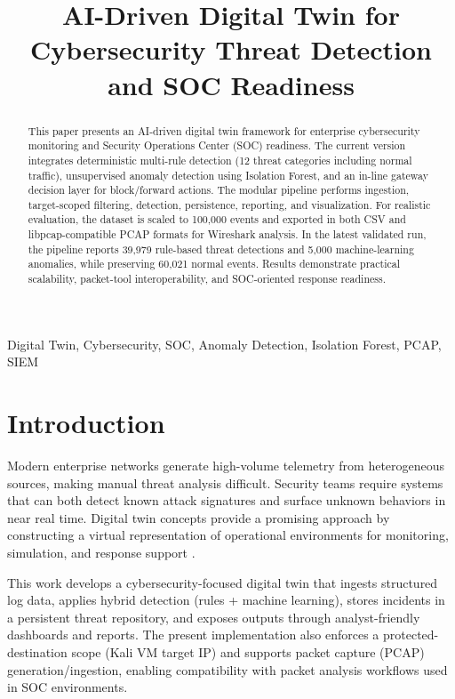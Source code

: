 \documentclass[conference]{IEEEtran}
\title{AI-Driven Digital Twin for Cybersecurity Threat Detection and SOC Readiness}
\author{%
\IEEEauthorblockN{U Jithendra Bhupathi Raju, K Aditya Sai}
\IEEEauthorblockA{Department of Computer Science and Engineering (Cyber Security)\\
Amrita Vishwa Vidyapeetham\\
Emails: jithendraupendram0@gmail.com, adityasai@gmail.com}
}
\begin{document}
\maketitle

\begin{abstract}
This paper presents an AI-driven digital twin framework for enterprise cybersecurity monitoring and Security Operations Center (SOC) readiness. The current version integrates deterministic multi-rule detection (12 threat categories including normal traffic), unsupervised anomaly detection using Isolation Forest, and an in-line gateway decision layer for block/forward actions. The modular pipeline performs ingestion, target-scoped filtering, detection, persistence, reporting, and visualization. For realistic evaluation, the dataset is scaled to 100,000 events and exported in both CSV and libpcap-compatible PCAP formats for Wireshark analysis. In the latest validated run, the pipeline reports 39,979 rule-based threat detections and 5,000 machine-learning anomalies, while preserving 60,021 normal events. Results demonstrate practical scalability, packet-tool interoperability, and SOC-oriented response readiness.
\end{abstract}

\begin{IEEEkeywords}
Digital Twin, Cybersecurity, SOC, Anomaly Detection, Isolation Forest, PCAP, SIEM
\end{IEEEkeywords}

\section{Introduction}
Modern enterprise networks generate high-volume telemetry from heterogeneous sources, making manual threat analysis difficult. Security teams require systems that can both detect known attack signatures and surface unknown behaviors in near real time. Digital twin concepts provide a promising approach by constructing a virtual representation of operational environments for monitoring, simulation, and response support \cite{tao2018digitaltwin,fuller2020digitaltwin}.

This work develops a cybersecurity-focused digital twin that ingests structured log data, applies hybrid detection (rules + machine learning), stores incidents in a persistent threat repository, and exposes outputs through analyst-friendly dashboards and reports. The present implementation also enforces a protected-destination scope (Kali VM target IP) and supports packet capture (PCAP) generation/ingestion, enabling compatibility with packet analysis workflows used in SOC environments.
\end{document}
